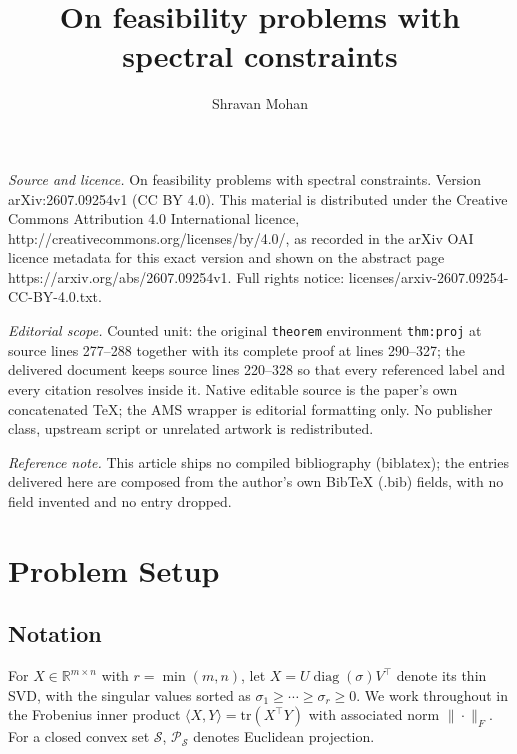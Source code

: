 \documentclass[10pt,a4paper]{amsart}
\DeclareMathOperator{\diag}{diag}
\newcommand{\R}{\mathbb{R}}
\newcommand{\sgm}{\sigma}
\newcommand{\proj}{\mathcal{P}}
\begin{document}
\title[On feasibility problems with spectral constraints]{On feasibility problems with spectral constraints}
\author{Shravan Mohan}
\date{}
\maketitle
\noindent\emph{Source and licence.} On feasibility problems with spectral constraints. Version arXiv:2607.09254v1 (CC BY 4.0). This material is distributed under the Creative Commons Attribution 4.0 International licence, http://creativecommons.org/licenses/by/4.0/, as recorded in the arXiv OAI licence metadata for this exact version and shown on the abstract page https://arxiv.org/abs/2607.09254v1. Full rights notice: licenses/arxiv-2607.09254-CC-BY-4.0.txt.\par\smallskip
\noindent\textit{Editorial scope.} Counted unit: the original \texttt{theorem} environment \texttt{thm:proj} at source lines 277--288 together with its complete proof at lines 290--327; the delivered document keeps source lines 220--328 so that every referenced label and every citation resolves inside it. Native editable source is the paper's own concatenated TeX; the AMS wrapper is editorial formatting only. No publisher class, upstream script or unrelated artwork is redistributed.
\par\smallskip\noindent\textit{Reference note.} This article ships no compiled bibliography (biblatex); the entries delivered here are composed from the author's own BibTeX (.bib) fields, with no field invented and no entry dropped.
\section{Problem Setup}\label{sec:setup}

\subsection{Notation}
For $X \in \R^{m\times n}$ with $r = \min(m,n)$, let
$X = U \diag(\sgm) V^\top$ denote its thin SVD, with the singular
values sorted as
$\sgm_1 \ge \cdots \ge \sgm_r \ge 0$.
We work throughout in the Frobenius inner product
$\langle X, Y\rangle = \mathrm{tr}(X^\top Y)$
with associated norm $\|\cdot\|_F$.
For a closed convex set $\mathcal{S}$, $\proj_{\mathcal{S}}$ denotes
Euclidean projection.
\end{document}
